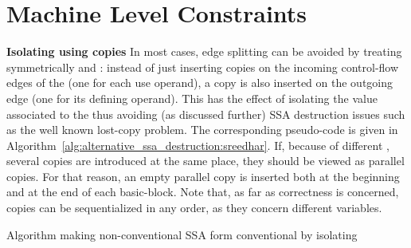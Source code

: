 \section{Machine Level Constraints}

{\bf Isolating \phinode using copies}
In most cases, edge splitting can be avoided by treating symmetrically \phiuses and \phidef: instead of just inserting copies on the incoming control-flow edges of the \phinode (one for each use operand), a copy is also inserted on the outgoing edge (one for its defining operand). This has the effect of isolating the value associated to the \phinode thus avoiding (as discussed further) SSA destruction issues such as the well known lost-copy problem.
The corresponding pseudo-code is given in Algorithm~\ref{alg:alternative_ssa_destruction:sreedhar}. If, because of different \phifuns, several copies are introduced at the
same place, they should be viewed as parallel copies. For that reason, an empty parallel copy is inserted both at the beginning and at the end of each basic-block.  
Note that, as far as correctness is concerned, copies
can be sequentialized in any order, as they concern different
variables. 

\begin{algorithm}
 \caption{\label{alg:alternative_ssa_destruction:sreedhar}Algorithm making non-conventional SSA form conventional by isolating \phinodes}
\end{algorithm}

